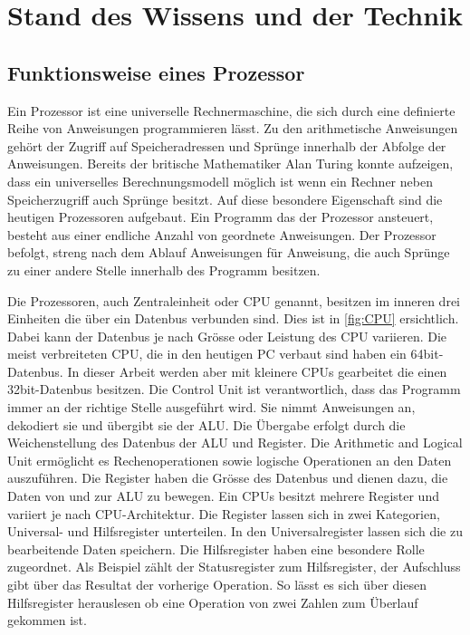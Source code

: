 \chapter{Stand des Wissens und der Technik}
\section{Funktionsweise eines Prozessor}

Ein Prozessor ist eine universelle Rechnermaschine, die sich durch eine definierte Reihe von Anweisungen programmieren lässt. Zu den arithmetische Anweisungen gehört der Zugriff auf Speicheradressen und Sprünge innerhalb der Abfolge der Anweisungen.
Bereits der britische Mathematiker Alan Turing konnte aufzeigen, dass ein universelles Berechnungsmodell möglich ist wenn ein Rechner neben Speicherzugriff auch Sprünge besitzt\cite{Hoffmann2014l}. Auf diese besondere Eigenschaft sind die heutigen Prozessoren aufgebaut. Ein Programm das der Prozessor ansteuert, besteht aus einer endliche Anzahl von geordnete Anweisungen. Der Prozessor befolgt, streng nach dem Ablauf Anweisungen für Anweisung, die auch Sprünge zu einer andere Stelle innerhalb des Programm besitzen.
\par
Die Prozessoren, auch Zentraleinheit oder CPU genannt, besitzen im inneren drei Einheiten die über ein Datenbus verbunden sind. Dies ist in \autoref{fig:CPU} ersichtlich. Dabei kann der Datenbus je nach Grösse oder Leistung des CPU variieren. Die meist verbreiteten CPU, die in den heutigen PC verbaut sind haben ein 64bit-Datenbus. In dieser Arbeit werden aber mit kleinere CPUs gearbeitet die einen 32bit-Datenbus besitzen. Die Control Unit\cite{patterson2013computer} ist verantwortlich, dass das Programm immer an der richtige Stelle ausgeführt wird. Sie nimmt Anweisungen an, dekodiert sie und übergibt sie der ALU. Die Übergabe erfolgt durch die Weichenstellung des Datenbus der ALU und Register. Die Arithmetic and Logical Unit ermöglicht es Rechenoperationen sowie logische Operationen an den Daten auszuführen. Die Register haben die Grösse des Datenbus und dienen dazu, die Daten von und zur ALU zu bewegen. Ein CPUs besitzt mehrere Register und variiert je nach CPU-Architektur. Die Register lassen sich in zwei Kategorien, Universal- und Hilfsregister unterteilen. In den Universalregister lassen sich die zu bearbeitende Daten speichern. Die Hilfsregister haben eine besondere Rolle zugeordnet. Als Beispiel zählt der Statusregister zum Hilfsregister, der Aufschluss gibt über das Resultat der vorherige Operation. So lässt es sich über diesen Hilfsregister herauslesen ob eine Operation von zwei Zahlen zum Überlauf gekommen ist.
